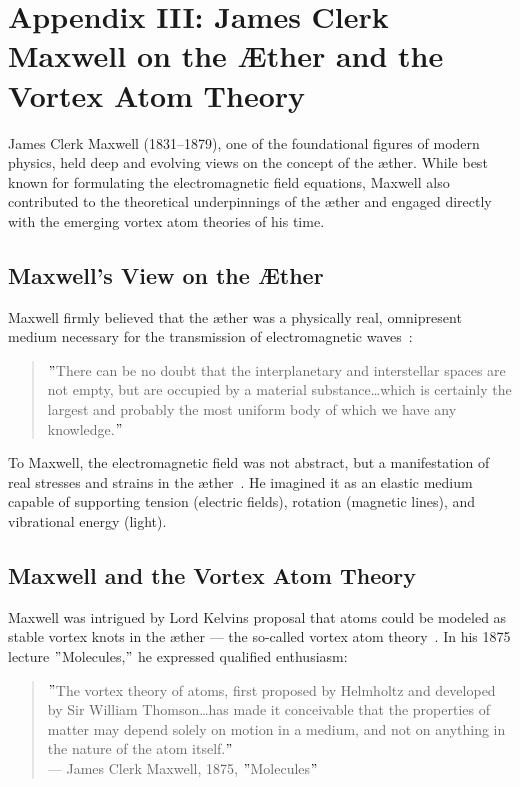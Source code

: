 \section*{Appendix III: James Clerk Maxwell on the Æther and the Vortex Atom Theory}

James Clerk Maxwell (1831–1879), one of the foundational figures of modern physics, held deep and evolving views on the concept of the æther. While best known for formulating the electromagnetic field equations, Maxwell also contributed to the theoretical underpinnings of the æther and engaged directly with the emerging vortex atom theories of his time.

\subsection*{Maxwell's View on the Æther}
Maxwell firmly believed that the æther was a physically real, omnipresent medium necessary for the transmission of electromagnetic waves~\cite{maxwell1878britannica}:

\begin{quote}
\("\)There can be no doubt that the interplanetary and interstellar spaces are not empty, but are occupied by a material substance\ldots which is certainly the largest and probably the most uniform body of which we have any knowledge.\("\)
\end{quote}

To Maxwell, the electromagnetic field was not abstract, but a manifestation of real stresses and strains in the æther~\cite{maxwell1878britannica}. He imagined it as an elastic medium capable of supporting tension (electric fields), rotation (magnetic lines), and vibrational energy (light).

\subsection*{Maxwell and the Vortex Atom Theory}

Maxwell was intrigued by Lord Kelvin\rqs s proposal that atoms could be modeled as stable vortex knots in the æther — the so-called vortex atom theory~\cite{maxwell1875molecules}. In his 1875 lecture \("\)Molecules,\("\) he expressed qualified enthusiasm:

\begin{quote}
\("\)The vortex theory of atoms, first proposed by Helmholtz and developed by Sir William Thomson\ldots has made it conceivable that the properties of matter may depend solely on motion in a medium, and not on anything in the nature of the atom itself.\("\)
\\— James Clerk Maxwell, 1875, \("\)Molecules\("\)
\end{quote}

